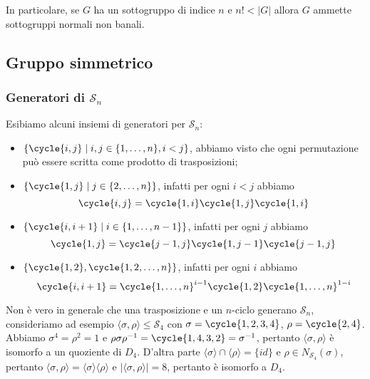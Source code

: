 \documentclass[11pt]{scrartcl}
\begin{document}
	\begin{remark}
		In particolare, se $G$ ha un sottogruppo di indice $n$ e $n! < |G|$
		allora $G$ ammette sottogruppi normali non banali.
	\end{remark}
	
	\newpage
	
	\subsection{Gruppo simmetrico}
	
	\subsubsection{Generatori di $\mathcal{S}_n$}
	
	Esibiamo alcuni insiemi di generatori per $\mathcal{S}_n$:
	
	\begin{itemize}
		\item $\{\cycle{i, j} \mid i, j \in\{1, \ldots, n\}, i < j\}$, abbiamo visto 
		che ogni permutazione può essere scritta come prodotto di trasposizioni;
		\item $\{\cycle{1, j}\mid j \in \{2, \ldots, n\}\}$, infatti per ogni $i<j$ abbiamo
		\[
		\cycle{i, j} = \cycle{1, i}\cycle{1, j}\cycle{1, i}
		\]
		\item $\{\cycle{i, i + 1}\mid i \in\{1, \ldots, n - 1\}\}$,
		infatti per ogni $j$ abbiamo 
		\[
		\cycle{1, j} = \cycle{j - 1, j}\cycle{1, j - 1}\cycle{j - 1, j}
		\]
		\item $\{\cycle{1, 2}, \cycle{1, 2, \ldots, n}\}$, infatti per ogni
		$i$ abbiamo 
		\[
		\cycle{i, i + 1} = \cycle{1, \ldots, n}^{i - 1}\cycle{1, 2}\cycle{1, \ldots, n}^{1 - i}
		\]
	\end{itemize}
	
	\begin{remark}
		Non è vero in generale che una trasposizione e un $n$-ciclo generano $\mathcal{S}_n$,
		consideriamo ad esempio $\langle\sigma, \rho\rangle\leqslant \mathcal{S}_4$ con
		$\sigma = \cycle{1, 2, 3, 4}$, $\rho = \cycle{2, 4}$. Abbiamo
		$\sigma^4 = \rho^2 = 1$ e $\rho\sigma\rho^{-1} = \cycle{1, 4, 3, 2} =
		\sigma^{-1}$, pertanto $\langle\sigma, \rho\rangle$ è isomorfo a un 
		quoziente di $D_4$. D'altra parte $\langle\sigma\rangle\cap \langle\rho\rangle = \{id\}$
		e $\rho \in N_{\mathcal{S}_4}(\sigma)$, pertanto $\langle\sigma, \rho\rangle =
		\langle\sigma\rangle\langle\rho\rangle$ e $|\langle\sigma, \rho\rangle| = 8$,
		pertanto è isomorfo a $D_4$. 
	\end{remark}
	
\end{document}
